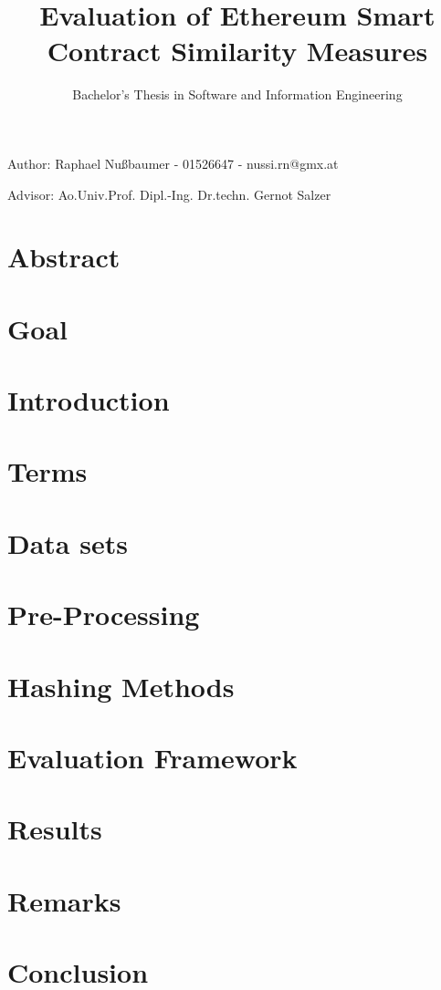 \documentclass{article}
\title{Evaluation of Ethereum Smart Contract Similarity Measures}
\author{Bachelor's Thesis in Software and Information Engineering}
\date{}
\begin{document}
\maketitle
Author: Raphael Nußbaumer - 01526647 - nussi.rn@gmx.at

Advisor: Ao.Univ.Prof. Dipl.-Ing. Dr.techn. Gernot Salzer

\section{Abstract}


\section{Goal}


\section{Introduction}


\section{Terms}


\section{Data sets}


\section{Pre-Processing}


\section{Hashing Methods}


\section{Evaluation Framework}


\section{Results}


\section{Remarks}


\section{Conclusion}


\printbibliography
\end{document}
